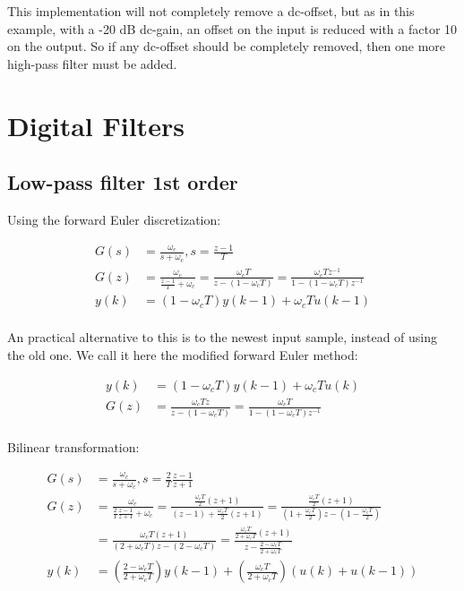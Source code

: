 \documentclass[]{book}
\begin{document}
This implementation will not completely remove a dc-offset, but as in this example, with a -20 dB dc-gain, an offset on the input is reduced with a factor 10 on the output. So if any dc-offset should be completely removed, then one more high-pass filter must be added.

\hypertarget{digital-filters}{%
\section{Digital Filters}\label{digital-filters}}

\hypertarget{low-pass-filter-1st-order-1}{%
\subsection{Low-pass filter 1st order}\label{low-pass-filter-1st-order-1}}

Using the forward Euler discretization:

\[
\begin{aligned}
G(s) &=  \frac{\omega_c}{s + \omega_c}, s=\frac{z-1}{T} \\
G(z) &=  \frac{\omega_c}{\frac{z-1}{T} + \omega_c} = \frac{\omega_c T}{z- (1 - \omega_c T)} 
= \frac{\omega_c T z^{-1}}{1- (1 - \omega_c T)z^{-1}} \\
y(k) &=   (1 - \omega_c T)y(k-1)   + \omega_c T u(k-1) \\
\end{aligned}
\label{eq:dlpf1}
\]

An practical alternative to this is to the newest input sample, instead of using the old one. We call it here the modified forward Euler method:

\[
\begin{aligned}
y(k) &= (1 - \omega_c T)y(k-1)   + \omega_c T u(k) \\
G(z) &=  \frac{\omega_c T z}{z- (1 - \omega_c T)} = \frac{\omega_c T }{1- (1 - \omega_c T)z^{-1}} \\
\end{aligned}
\label{eq:dlpf2}
\]

Bilinear transformation:

\[
\begin{aligned}
G(s) &=  \frac{\omega_c}{s + \omega_c}, s=\frac{2}{T} \frac{z-1}{z+1} \\
G(z) &=  \frac{\omega_c}{\frac{2}{T} \frac{z-1}{z+1} + \omega_c}
= \frac{ \frac{\omega_cT}{2}(z+1)}{ (z-1)+ \frac{\omega_cT}{2} (z+1)} 
= \frac{ \frac{\omega_cT}{2}(z+1)}{  (1+\frac{\omega_cT}{2}) z - (1-\frac{\omega_cT}{2})}  \\
 &=   \frac{ \omega_cT(z+1)}{  (2+\omega_cT) z - (2-\omega_cT)} 
 =  \frac{ \frac{\omega_cT}{2+\omega_cT}(z+1)}{   z - \frac{2-\omega_cT}{2+\omega_cT}}  \\
y(k) &=   \left( \frac{2-\omega_cT}{2+\omega_cT} \right) y(k-1)   + \left( \frac{\omega_cT}{2+\omega_cT} \right)  (u(k)+u(k-1)) \\
\end{aligned}
\label{eq:dlpf3}
\]
\end{document}
